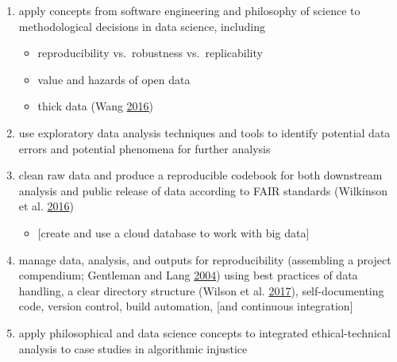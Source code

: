 \documentclass[
]{article}
\providecommand{\tightlist}{%
  \setlength{\itemsep}{0pt}\setlength{\parskip}{0pt}}
\begin{document}
\begin{enumerate}
\def\labelenumi{\arabic{enumi}.}
\item
  apply concepts from software engineering and philosophy of science to methodological decisions in data science, including

  \begin{itemize}
  \tightlist
  \item
    reproducibility vs.~robustness vs.~replicability
  \item
    value and hazards of open data
  \item
    thick data (Wang \protect\hyperlink{ref-WangWhyBigData2016}{2016})
  \end{itemize}
\item
  use exploratory data analysis techniques and tools to identify potential data errors and potential phenomena for further analysis
\item
  clean raw data and produce a reproducible codebook for both downstream analysis and public release of data according to FAIR standards (Wilkinson et al. \protect\hyperlink{ref-WilkinsonFAIRGuidingPrinciples2016}{2016})

  \begin{itemize}
  \tightlist
  \item
    {[}create and use a cloud database to work with big data{]}
  \end{itemize}
\item
  manage data, analysis, and outputs for reproducibility (assembling a project compendium; Gentleman and Lang \protect\hyperlink{ref-GentlemanStatisticalAnalysesReproducible2004}{2004}) using best practices of data handling, a clear directory structure (Wilson et al. \protect\hyperlink{ref-WilsonGoodEnoughPractices2017}{2017}), self-documenting code, version control, build automation, {[}and continuous integration{]}
\item
  apply philosophical and data science concepts to integrated ethical-technical analysis to case studies in algorithmic injustice


\end{enumerate}
\end{document}
